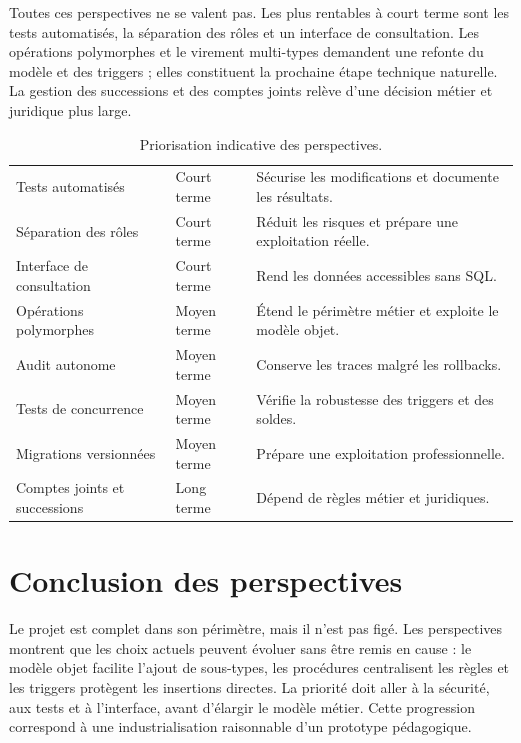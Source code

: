 Toutes ces perspectives ne se valent pas. Les plus rentables à court terme
sont les tests automatisés, la séparation des rôles et un interface de
consultation. Les opérations polymorphes et le virement multi-types demandent
une refonte du modèle et des triggers ; elles constituent la prochaine étape
technique naturelle. La gestion des successions et des comptes joints relève
d'une décision métier et juridique plus large.

\begin{table}[htbp]
  \centering
  \small
  \caption{Priorisation indicative des perspectives.}
  \label{tab:priorisation-perspectives}
  \begin{tabularx}{\textwidth}{@{}L{4.4cm}L{2.4cm}X@{}}
    \toprule
     &  &  \\
    \midrule
    Tests automatisés & Court terme &
    Sécurise les modifications et documente les résultats. \\
    Séparation des rôles & Court terme &
    Réduit les risques et prépare une exploitation réelle. \\
    Interface de consultation & Court terme &
    Rend les données accessibles sans SQL. \\
    Opérations polymorphes & Moyen terme &
    Étend le périmètre métier et exploite le modèle objet. \\
    Audit autonome & Moyen terme &
    Conserve les traces malgré les rollbacks. \\
    Tests de concurrence & Moyen terme &
    Vérifie la robustesse des triggers et des soldes. \\
    Migrations versionnées & Moyen terme &
    Prépare une exploitation professionnelle. \\
    Comptes joints et successions & Long terme &
    Dépend de règles métier et juridiques. \\
    \bottomrule
  \end{tabularx}
\end{table}

\section{Conclusion des perspectives}

Le projet est complet dans son périmètre, mais il n'est pas figé. Les
perspectives montrent que les choix actuels peuvent évoluer sans être remis en
cause : le modèle objet facilite l'ajout de sous-types, les procédures
centralisent les règles et les triggers protègent les insertions directes. La
priorité doit aller à la sécurité, aux tests et à l'interface, avant d'élargir
le modèle métier. Cette progression correspond à une industrialisation
raisonnable d'un prototype pédagogique.
